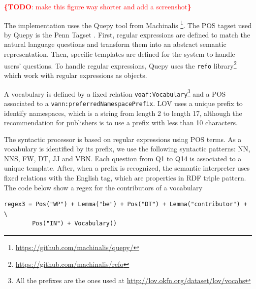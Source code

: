 \documentclass[runningheads,a4paper]{llncs}
\newcommand{\todo}[1]{\noindent\textcolor{red}{{\bf \{TODO}: #1{\bf \}}}}
\begin{document}
\todo{make this figure way shorter and add a screenshot}

The implementation uses the Quepy tool from Machinalis \footnote{\url{https://github.com/machinalis/quepy/}}. The POS tagset used by Quepy is the Penn Tagset \cite{marcus1993building}. First, regular expressions are defined to match the natural language questions and transform them into an abstract semantic representation. Then, specific templates are defined for the system to handle users' questions. To handle regular expressions, Quepy uses the \texttt{refo} library\footnote{\url{https://github.com/machinalis/refo}} which work with regular expressions as objects. 

A vocabulary is defined by a fixed relation \texttt{voaf:Vocabulary}\footnote{All the prefixes are the ones used at \url{http://lov.okfn.org/dataset/lov/vocabs}} and a POS associated to a \texttt{vann:preferredNamespacePrefix}. LOV uses a unique prefix to identify namespaces, which is a string from length 2 to length 17, although the recommendation for publishers is to use a prefix with less than 10 characters.

The syntactic processor is based on regular expressions using POS terms. As a vocabulary is identified by its prefix, we use  the following syntactic patterns: NN, NNS, FW, DT, JJ and VBN. Each question from Q1 to Q14 is associated to a unique template. After, when a prefix is recognized, the semantic interpreter uses fixed relations with the English tag, which are properties in RDF triple pattern. The code below show a regex for the contributors of a vocabulary 
\begin{verbatim}
regex3 = Pos("WP") + Lemma("be") + Pos("DT") + Lemma("contributor") + \
        Pos("IN") + Vocabulary()
\end{verbatim}

\end{document}
